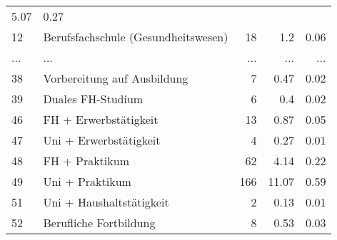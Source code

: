 \begin{longtable}{lXrrr}
          \num[round-mode=places,round-precision=2]{5,07} &
          \num[round-mode=places,round-precision=2]{0,27} \\
        12 & \multicolumn{1}{X}{Berufsfachschule (Gesundheitswesen)} & %
          \num{18} &
          \num[round-mode=places,round-precision=2]{1,2} &
          \num[round-mode=places,round-precision=2]{0,06} \\
       ... & ... & ... & ... & ... \\
        38 & \multicolumn{1}{X}{Vorbereitung auf Ausbildung} & %
          \num{7} &
          \num[round-mode=places,round-precision=2]{0,47} &
          \num[round-mode=places,round-precision=2]{0,02} \\

        39 & \multicolumn{1}{X}{Duales FH-Studium} & %
          \num{6} &
          \num[round-mode=places,round-precision=2]{0,4} &
          \num[round-mode=places,round-precision=2]{0,02} \\

        46 & \multicolumn{1}{X}{FH + Erwerbstätigkeit} & %
          \num{13} &
          \num[round-mode=places,round-precision=2]{0,87} &
          \num[round-mode=places,round-precision=2]{0,05} \\

        47 & \multicolumn{1}{X}{Uni + Erwerbstätigkeit} & %
          \num{4} &
          \num[round-mode=places,round-precision=2]{0,27} &
          \num[round-mode=places,round-precision=2]{0,01} \\

        48 & \multicolumn{1}{X}{FH + Praktikum} & %
          \num{62} &
          \num[round-mode=places,round-precision=2]{4,14} &
          \num[round-mode=places,round-precision=2]{0,22} \\

        49 & \multicolumn{1}{X}{Uni + Praktikum} & %
          \num{166} &
          \num[round-mode=places,round-precision=2]{11,07} &
          \num[round-mode=places,round-precision=2]{0,59} \\

        51 & \multicolumn{1}{X}{Uni + Haushaltstätigkeit} & %
          \num{2} &
          \num[round-mode=places,round-precision=2]{0,13} &
          \num[round-mode=places,round-precision=2]{0,01} \\

        52 & \multicolumn{1}{X}{Berufliche Fortbildung} & %
          \num{8} &
          \num[round-mode=places,round-precision=2]{0,53} &
          \num[round-mode=places,round-precision=2]{0,03} \\


\end{longtable}
